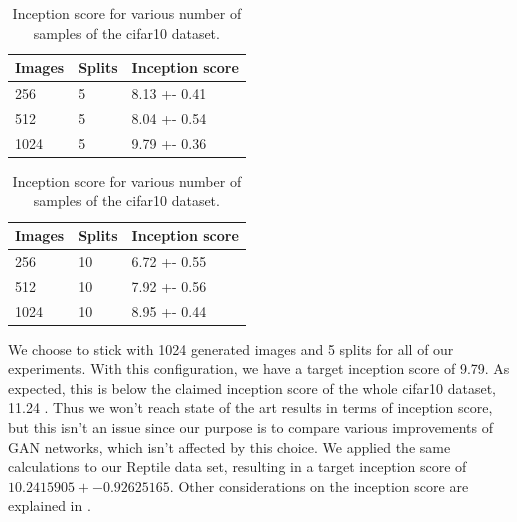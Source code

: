 \begin{table}[H]
\centering
\setlength{\tabcolsep}{0.5em} %

\begin{subtable}{.5\textwidth}
\centering

\begin{tabular}{l l l}
\toprule
Images & Splits & Inception score  \\ 
\midrule
      256  & 5 & 8.13 +- 0.41 \\   
      512  & 5 & 8.04 +- 0.54 \\ 
      1024 & 5 & 9.79 +- 0.36 \\
\bottomrule
\end{tabular}

\end{subtable}%
\begin{subtable}{.5\textwidth}
\centering

\begin{tabular}{l l l}
\toprule
Images & Splits & Inception score  \\ 
\midrule
      256  & 10 & 6.72 +- 0.55 \\   
      512  & 10 & 7.92 +- 0.56\\ 
      1024 & 10 & 8.95 +- 0.44 \\
\bottomrule
\end{tabular}
\end{subtable}%
%
\vspace{0.3cm}
\caption{Inception score for various number of samples of the cifar10 dataset.}
\label{table:exp-isc}
\end{table}%
We choose to stick with 1024 generated images and 5 splits for all of our experiments. With this configuration, we have a target inception score of 9.79. As expected, this is below the claimed inception score of the whole cifar10 dataset, 11.24 \cite{salimans2016improved}. Thus we won't reach state of the art results in terms of inception score, but this isn't an issue since our purpose is to compare various improvements of GAN networks, which isn't affected by this choice. We applied the same calculations to our Reptile data set, resulting in a target inception score of $10.2415905 +- 0.92625165$. Other considerations on the inception score are explained in \cite{barratt2018note}.










